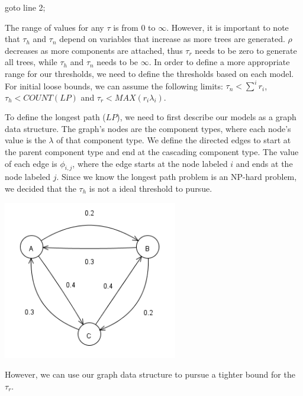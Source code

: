 \documentclass[12pt]{article}
\begin{document}
\begin{algorithmic}
		\STATE goto line 2;
	\ENDIF
\end{algorithmic}

\vspace{1em}
The range of values for any $\tau$ is from 0 to $\infty$. However, it is important to note that $\tau_h$ and $\tau_n$ depend on variables that increase as more trees are generated.  $\rho$ decreases as more components are attached, thus $\tau_r$ needs to be zero to generate all trees, while $\tau_h$ and $\tau_n$ needs to be $\infty$.  In order to define a more appropriate range for our thresholds, we need to define the thresholds based on each model.   For initial loose bounds, we can assume the following limits: $\tau_n < \displaystyle\sum^i r_i$, $\tau_h < COUNT(LP)$ and $\tau_r < MAX(r_i \lambda_i)$.

To define the longest path ($LP$), we need to first describe our models as a graph data structure.  The graph's nodes are the component types, where each node's value is the $\lambda$ of that component type.  We define the directed edges to start at the parent component type and end at the cascading component type.  The value of each edge is $\phi_{i, j}$, where the edge starts at the node labeled $i$ and ends at the node labeled $j$.  Since we know the longest path problem is an NP-hard problem, we decided that the $\tau_h$ is not a ideal threshold to pursue.

\begin{minipage}[c]{\textwidth}
	\centering
	\includegraphics[width=3.0in]{simulation125model.png}
	\label{fig:model}
\end{minipage}

\vspace{1em}
However, we can use our graph data structure to pursue a tighter bound for the $\tau_r$.
\end{document}

